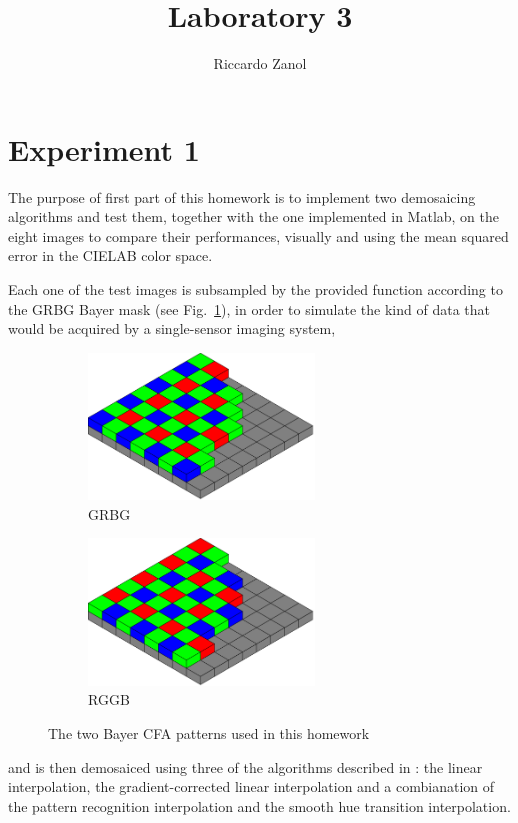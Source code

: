 \documentclass[a4paper,oneside]{article}
\author{Riccardo Zanol}
\title{Laboratory 3}
\begin{document}
\matlabcodeconfig
\maketitle
\section*{Experiment 1}
The purpose of first part of this homework is to implement two
demosaicing algorithms and test them, together with the one
implemented in Matlab, on the eight images 
to compare their performances, visually and using the mean squared
error in the CIELAB color space.

Each one of the test images is subsampled by the provided function
 according to the GRBG Bayer mask (see
Fig.~\ref{fig:bayer_grbg}), in order to simulate the kind of data that
would be acquired by a single-sensor imaging system,
\begin{figure}[htbp]
  \centering
  \begin{subfigure}{0.5\textwidth}
    \centering
    \includegraphics[width=0.66\textwidth]{include_imgs/bayer_grbg}
    \caption{GRBG}
    \label{fig:bayer_grbg}
  \end{subfigure}%
  \begin{subfigure}{0.5\textwidth}
    \centering
    \includegraphics[width=0.66\textwidth]{include_imgs/bayer_rggb}
    \caption{RGGB}
    \label{fig:bayer_rggb}
  \end{subfigure}
  \caption{The two Bayer CFA patterns used in this homework}
\end{figure}
and is then demosaiced using three of the algorithms described in
\cite{demosaic_alg}: the linear interpolation, the gradient-corrected
linear interpolation and a combianation of the pattern recognition
interpolation and the smooth hue transition interpolation.
\end{document}
